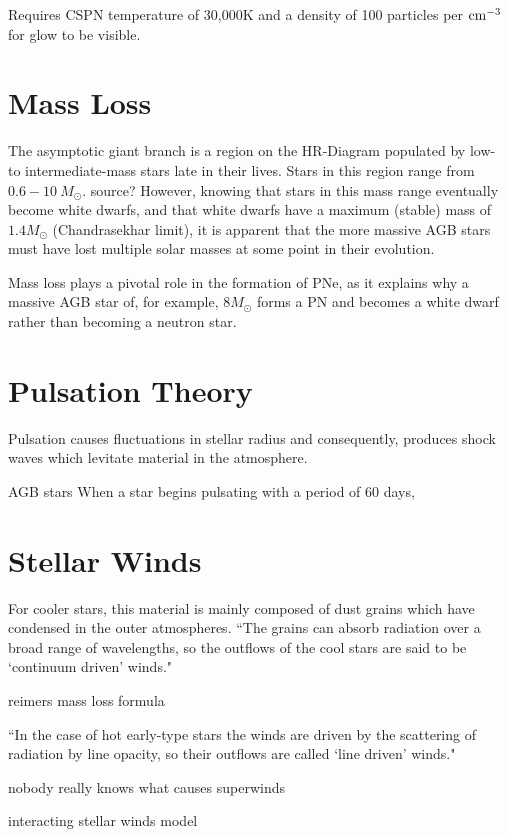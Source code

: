 \documentclass[a4paper,12pt]{article}
\begin{document}
Requires CSPN temperature of 30,000K and a density of 100 particles per ${\rm cm^{-3}}$ for glow to be visible.

\section{Mass Loss}

The asymptotic giant branch is a region on the HR-Diagram populated by low- to intermediate-mass stars late in their lives. Stars in this region range from $0.6-10~M_\odot$. {\huge source?} However, knowing that stars in this mass range eventually become white dwarfs, and that white dwarfs have a maximum (stable) mass of $1.4 M_\odot$ (Chandrasekhar limit), it is apparent that the more massive AGB stars must have lost multiple solar masses at some point in their evolution. 

Mass loss plays a pivotal role in the formation of PNe, as it explains why a massive AGB star of, for example, $8 M_\odot$ forms a PN and becomes a white dwarf rather than becoming a neutron star. 

\section{Pulsation Theory}

Pulsation causes fluctuations in stellar radius and consequently, produces shock waves which levitate material in the atmosphere. 

AGB stars When a star begins pulsating with a period of 60 days, 


\section{Stellar Winds}

For cooler stars, this material is mainly composed of dust grains which have condensed in the outer atmospheres. ``The grains can absorb radiation over a broad range of wavelengths, so the outflows of the cool stars are said to be ‘continuum driven’ winds." \cite{lamers}

{\huge reimers mass loss formula}

``In the case of hot early-type stars the winds are driven by the scattering of radiation by line opacity, so their outflows are called ‘line driven’ winds." \cite{lamers}

{\huge nobody really knows what causes superwinds}

{\huge interacting stellar winds model}
\end{document}
